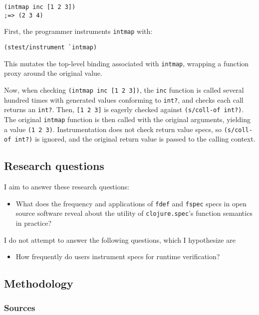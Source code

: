 \begin{verbatim}
(intmap inc [1 2 3])
;=> (2 3 4)
\end{verbatim}

First, the programmer instruments \texttt{intmap} with:

\begin{verbatim}
(stest/instrument `intmap)
\end{verbatim}

This mutates the top-level binding associated with \texttt{intmap}, wrapping a function
proxy around the original value.

Now, when checking \texttt{(intmap inc [1 2 3])}, the \texttt{inc} function is
called several hundred times with generated values conforming to \texttt{int?},
and checks each call returns an \texttt{int?}.
Then, \texttt{[1 2 3]} is eagerly checked against \texttt{(s/coll-of int?)}.
The original \texttt{intmap} function is then called with the original arguments,
yielding a value \texttt{(1 2 3)}. Instrumentation does not check return value specs,
so \texttt{(s/coll-of int?)} is ignored, and the original return value is passed to the calling
context.

\subsection{Research questions}

I aim to answer these research questions:

\begin{itemize}
  \item What does the frequency and applications of \texttt{fdef} and \texttt{fspec} specs
    in open source software reveal about the utility of \texttt{clojure.spec}'s
    function semantics in practice?
\end{itemize}

I do not attempt to answer the following questions, which I hypothesize are

\begin{itemize}
  \item How frequently do users instrument specs for runtime verification?
\end{itemize}

\subsection{Methodology}

\subsubsection{Sources}

